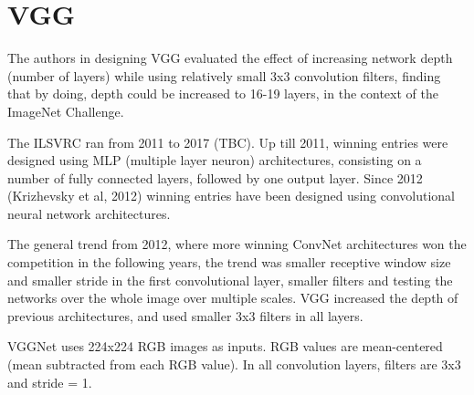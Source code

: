 \documentclass{article}
\begin{document}
\section{VGG}

The authors in designing VGG evaluated the effect of increasing network depth (number of layers) while using relatively small 3x3 convolution filters, finding that by doing, depth could be increased to 16-19 layers, in the context of the ImageNet Challenge.

The ILSVRC ran from 2011 to 2017 (TBC). Up till 2011, winning entries were designed using MLP (multiple layer neuron) architectures, consisting on a number of fully connected layers, followed by one output layer. Since 2012 (Krizhevsky et al, 2012) winning entries have been designed using convolutional neural network architectures.  

The general trend from 2012, where more winning ConvNet architectures won the competition in the following years, the trend was smaller receptive window size and smaller stride in the first convolutional layer, smaller filters and testing the networks over the whole image over multiple scales. VGG increased the depth of previous architectures, and used smaller 3x3 filters in all layers.

VGGNet uses 224x224 RGB images as inputs. RGB values are mean-centered (mean subtracted from each RGB value). In all convolution layers, filters are 3x3 and stride = 1. 
\end{document}
